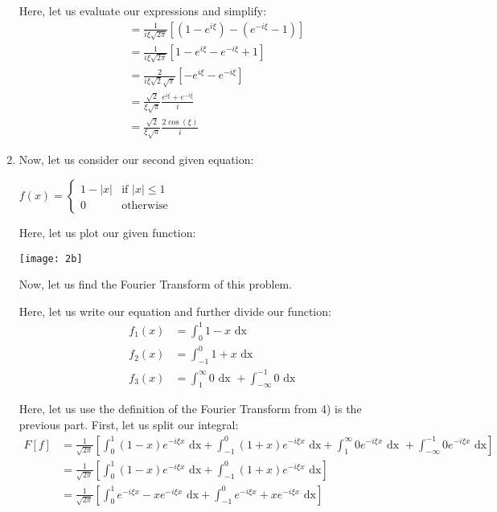 \begin{enumerate}
Here, let us evaluate our expressions and simplify:
%
\begin{align}
  & =
  \frac{1}{i \xi \sqrt{2 \pi}}
  \left[
  \left(
  1 - e^{i \xi}
  \right)
  -
  \left(
  e^{-i \xi} - 1
  \right)
  \right]\\
  & =
  \frac{1}{i \xi \sqrt{2 \pi}}
  \left[
  1 - e^{i \xi}
  - e^{-i \xi} + 1
  \right]\\
  & =
  \frac{2}{i \xi \sqrt{2} \sqrt{\pi}}
  \left[
  - e^{i \xi} - e^{-i \xi}
  \right]\\
  & =
  \frac{\sqrt 2}{\xi \sqrt \pi}
  \frac{e^{i \xi} + e^{-i \xi}}{i}\\
  & =
  \frac{\sqrt 2}{\xi \sqrt \pi}
  \frac{2 \cos(\xi)}{i}
\end{align}


\setcounter{equation}{0}
\newpage
\item Now, let us consider our second given equation:

$\displaystyle
f(x) =
\begin{cases}
  1 - |x| & \text{if } |x| \leq 1\\
  0 & \text{otherwise}
\end{cases}
$

Here, let us plot our given function:

\begin{center}
  \texttt{[image: 2b]}
\end{center}

Now, let us find the Fourier Transform of this problem.

Here, let us write our equation and further divide our function:
%
\begin{align}
  f_1(x) & = \int^1_0 1 - x \text{ dx}\\
  f_2(x) & = \int^0_{-1} 1 + x \text{ dx}\\
  f_3(x) & = \int^\infty_1 0 \text{ dx } + \int^{-1}_{-\infty} 0 \text{ dx}
\end{align}

Here, let us use the definition of the Fourier Transform from 4) is the previous part. First, let us split our integral:
%
\begin{align}
  F[f]
  & = \frac{1}{\sqrt{2 \pi}}
  \left[
    \int^1_0            (1 - x) e^{-i \xi x} \text{ dx}
  + \int^0_{-1}         (1 + x) e^{-i \xi x} \text{ dx}
  + \int^\infty_1       0     e^{-i \xi x} \text{ dx }
  + \int^{-1}_{-\infty} 0     e^{-i \xi x} \text{ dx}
  \right]\\
  & =
  \frac{1}{\sqrt{2 \pi}}
  \left[
    \int^1_0    (1 - x) e^{-i \xi x} \text{ dx}
  + \int^0_{-1} (1 + x) e^{-i \xi x} \text{ dx}
  \right]\\
  & =
  \frac{1}{\sqrt{2 \pi}}
  \left[
    \int^1_0    e^{-i \xi x} - x e^{-i \xi x} \text{ dx}
  + \int^0_{-1} e^{-i \xi x} + x e^{-i \xi x} \text{ dx}
  \right]
\end{align}


\end{enumerate}
